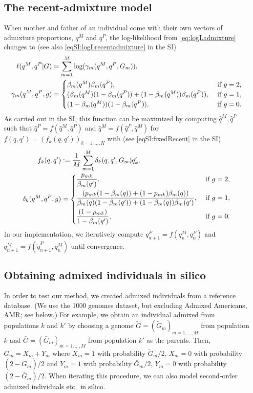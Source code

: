\documentclass[12pt]{article}
\theoremstyle{definition}
\begin{document}
\subsection{The recent-admixture model}
When mother and father of an individual come with their own vectors of
admixture proportions, $q^M$ and $q^P$, the log-likelihood from
\eqref{eq:logLadmixture} changes to (see also
\eqref{eqSI:logLrecentadmixture} in the SI)
\begin{align}\label{eq:logLrecentadmixture}
  \ell(q^M, q^P|G) & = \sum_{m=1}^M \log( \gamma_m(q^M, q^P, G_m)),
  \\
  \notag
  \gamma_m(q^M, q^P, g) & = \begin{cases}\beta_m(q^M) \beta_m(q^P), & \text{ if }g=2,\\
    (\beta_m(q^M) (1-\beta_m(q^P))
    + (1-\beta_m(q^M)) \beta_m(q^P)), & \text{ if }g=1,\\
    (1-\beta_m(q^M))(1-\beta_m(q^P)), & \text{ if }g=0. \end{cases}
\end{align}
\sloppy As carried out in the SI, this function can be maximized by
computing $\hat q^M, \hat q^P$ such that
$\hat q^P = f(\hat q^M, \hat q^P)$ and
$\hat q^M = f(\hat q^P, \hat q^M)$ for
$f(q,q') = (f_k(q, q'))_{k=1,...,K}$ with (see
\eqref{eqSI:fixedRecent} in the SI)
\begin{align}\label{eq:fixedRecent}
  f_k(q, q') & := \frac{1}{M}\sum_{m=1}^M \delta_k(q,q', G_m) q_k',
  \\
  \notag
  \delta_k(q^M, q^P, g) & = \begin{cases}
    \displaystyle\frac{p_{mk}}{\beta_m(q')}, & \text{ if }g=2,\\[2ex]
    \displaystyle\frac{(p_{mk} (1-\beta_m(q))
      + (1-p_{mk})\beta_m(q))}{\beta_m(q)(1-\beta_m(q'))
      + (1-\beta_m(q))\beta_m(q')}, & \text{ if }g=1,\\[2ex]
    \displaystyle\frac{(1-p_{mk})}{1-\beta_m(q')}, & \text{ if }g=0. \end{cases}
\end{align}
In our implementation, we iteratively compute
$q_{n+1}^P = f(q_n^M, q_n^P)$ and
$q_{n+1}^M = f(\tilde q_{n+1}^P, q_n^M)$ until convergence.

\subsection{Obtaining admixed individuals in silico}
\label{S:insilico}
In order to test our method, we created admixed individuals from a
reference database. (We use the 1000 genomes dataset, but excluding
Admixed Americans, AMR; see below.) For example, we obtain an
individual admixed from populations $k$ and $k'$ by choosing a genome
$\tilde G = (\tilde G_m)_{m=1,...,M}$ from population $k$ and
$\bar G = (\bar G_m)_{m=1,...,M}$ from population $k'$ as the
parents. Then, $G_m = X_m + Y_m$ where $X_m = 1$ with probability
$\tilde G_m/2$, $X_m=0$ with probability $(2-\tilde G_m)/2$ and
$Y_m = 1$ with probability $\bar G_m/2$, $Y_m=0$ with probability
$(2-\bar G_m)/2$. When iterating this procedure, we can also model
second-order admixed individuals etc.\ in silico.
\end{document}
